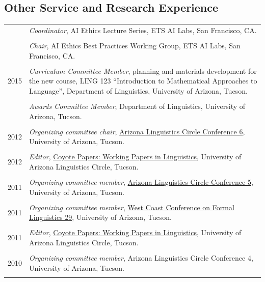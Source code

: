 \subsection*{Other Service and Research Experience}
\noindent
\begin{longtable}{p{} p{}}
	\daterange{2023}{2024} & \textit{Coordinator}, AI Ethics Lecture Series, ETS AI Labs, San Francisco, CA. \\ \\
	\daterange{2022}{2023} & \textit{Chair}, AI Ethics Best Practices Working Group, ETS AI Labs, San Francisco, CA. \\ \\
	2015 & \textit{Curriculum Committee Member}, planning and materials development for the new course, LING 123 ``Introduction to Mathematical Approaches to Language'', Department of Linguistics, University of Arizona, Tucson. \\ \\
	\daterange{2012}{2013} & \textit{Awards Committee Member}, Department of Linguistics, University of Arizona, Tucson. \\ \\
	2012 & \textit{Organizing committee chair}, \href{http://coyotepapers.sbs.arizona.edu/alc6/}{Arizona Linguistics Circle Conference 6}, University of Arizona, Tucson. \\ \\
	2012 & \textit{Editor}, \href{http://coyotepapers.sbs.arizona.edu/}{Coyote Papers: Working Papers in Linguistics}, University of Arizona Linguistics Circle, Tucson. \\ \\
	2011 & \textit{Organizing committee member}, \href{https://sites.google.com/a/email.arizona.edu/arizona-linguistics-circle-5/}{Arizona Linguistics Circle Conference 5}, University of Arizona, Tucson. \\ \\
	2011 & \textit{Organizing committee member}, \href{http://linguistics.arizona.edu/node/713}{West Coast Conference on Formal Linguistics 29}, University of Arizona, Tucson. \\ \\
	2011 & \textit{Editor}, \href{http://coyotepapers.sbs.arizona.edu/}{Coyote Papers: Working Papers in Linguistics}, University of Arizona Linguistics Circle, Tucson. \\ \\
	2010 & \textit{Organizing committee member}, Arizona Linguistics Circle Conference 4, University of Arizona, Tucson. \\ \\

\end{longtable}
